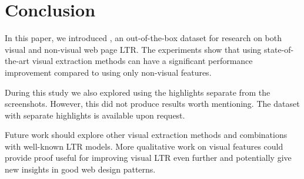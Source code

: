 
\section{Conclusion}
In this paper, we introduced \datasetname, an out-of-the-box dataset for research on both visual and non-visual web page \ac{LTR}. The experiments show that using state-of-the-art visual extraction methods can have a significant performance improvement compared to using only non-visual features. 

 During this study we also explored using the highlights separate from the screenshots. However, this did not produce results worth mentioning. The dataset with separate highlights is available upon request. 
\fi

Future work should explore other visual extraction methods and combinations with well-known \ac{LTR} models. More qualitative work on visual features could provide proof useful for improving visual \ac{LTR} even further and potentially give new insights in good web design patterns. 

